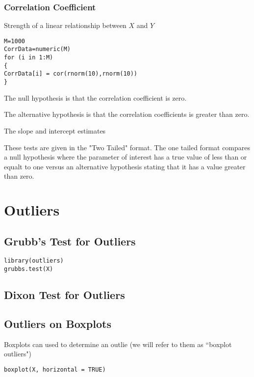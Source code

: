\documentclass[a4paper,12pt]{article}
\begin{document}
\begin{itemize}
\begin{itemize}
\subsubsection{Correlation Coefficient}
Strength of a linear relationship between $X$ and $Y$

\begin{verbatim}
M=1000
CorrData=numeric(M)
for (i in 1:M)
{
CorrData[i] = cor(rnorm(10),rnorm(10))
}
\end{verbatim}
The null hypothesis is that the correlation coefficient is zero. 

The alternative hypothesis is that the correlation coefficients is greater than zero. 

The slope and intercept estimates 

These tests are given in the "Two Tailed" format. 
The one tailed format compares a null hypothesis where the parameter of interest has a true value of less than or equalt to one versus an alternative hypothesis stating that it has a value greater than zero. 
  


\newpage
\section{Outliers}
\subsection{Grubb's Test for Outliers}
\begin{framed}
\begin{verbatim}
library(outliers)
grubbs.test(X)
\end{verbatim}
\end{framed}
\subsection{Dixon Test for Outliers}
\subsection{Outliers on Boxplots}
Boxplots can used to determine an outlie (we will refer to them as ``boxplot outliers")
\begin{framed}
\begin{verbatim}
boxplot(X, horizontal = TRUE)
\end{verbatim}
\end{framed}


\end{itemize}
\end{itemize}
\end{document}
